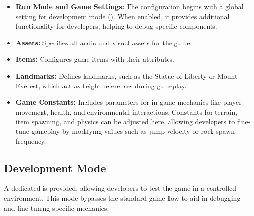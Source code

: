 \begin{itemize}
  \item \textbf{Run Mode and Game Settings:} 
  The configuration begins with a global setting for development mode (). 
  When enabled, it provides additional functionality for developers, helping to debug specific components.

  \item \textbf{Assets:} 
  Specifies all audio and visual assets for the game.

  \item \textbf{Items:} 
  Configures game items with their attributes.

  \item \textbf{Landmarks:}
  Defines landmarks, such as the Statue of Liberty or Mount Everest, which act as height references during gameplay.

  \item \textbf{Game Constants:} 
  Includes parameters for in-game mechanics like player movement, health, and environmental interactions. Constants for terrain, item spawning, and physics can be adjusted here, allowing developers to fine-tune gameplay by modifying values such as jump velocity or rock spawn frequency.
\end{itemize}

\subsection{Development Mode}
A dedicated  is provided, allowing developers to test the game in a controlled environment. This mode bypasses the standard game flow to aid in debugging and fine-tuning specific mechanics.
\pagebreak